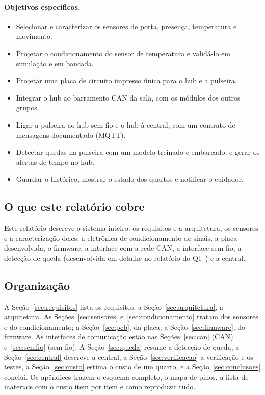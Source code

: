 \paragraph{Objetivos específicos.}
\begin{itemize}
  \item Selecionar e caracterizar os sensores de porta, presença, temperatura e movimento.
  \item Projetar o condicionamento do sensor de temperatura e validá-lo em simulação e em bancada.
  \item Projetar uma placa de circuito impresso única para o hub e a pulseira.
  \item Integrar o hub ao barramento CAN da sala, com os módulos dos outros grupos.
  \item Ligar a pulseira ao hub sem fio e o hub à central, com um contrato de mensagens
        documentado (MQTT).
  \item Detectar quedas na pulseira com um modelo treinado e embarcado, e gerar os alertas
        de tempo no hub.
  \item Guardar o histórico, mostrar o estado dos quartos e notificar o cuidador.
\end{itemize}

\subsection{O que este relatório cobre}

Este relatório descreve o sistema inteiro: os requisitos e a arquitetura, os sensores e a
caracterização deles, a eletrônica de condicionamento de sinais, a placa desenvolvida, o
firmware, a interface com a rede CAN, a interface sem fio, a detecção de queda (desenvolvida
em detalhe no relatório do Q1~\cite{q1}) e a central.

\subsection{Organização}

A Seção~\ref{sec:requisitos} lista os requisitos; a Seção~\ref{sec:arquitetura}, a
arquitetura. As Seções~\ref{sec:sensores} e~\ref{sec:condicionamento} tratam dos sensores e
do condicionamento; a Seção~\ref{sec:pcb}, da placa; a Seção~\ref{sec:firmware}, do
firmware. As interfaces de comunicação estão nas Seções~\ref{sec:can} (CAN)
e~\ref{sec:semfio} (sem fio). A Seção~\ref{sec:queda} resume a detecção de queda, a
Seção~\ref{sec:central} descreve a central, a Seção~\ref{sec:verificacao} a verificação e os
testes, a Seção~\ref{sec:custo} estima o custo de um quarto, e a Seção~\ref{sec:conclusoes}
conclui. Os apêndices trazem o esquema completo, o mapa de pinos, a lista de materiais com o
custo item por item e como reproduzir tudo.
